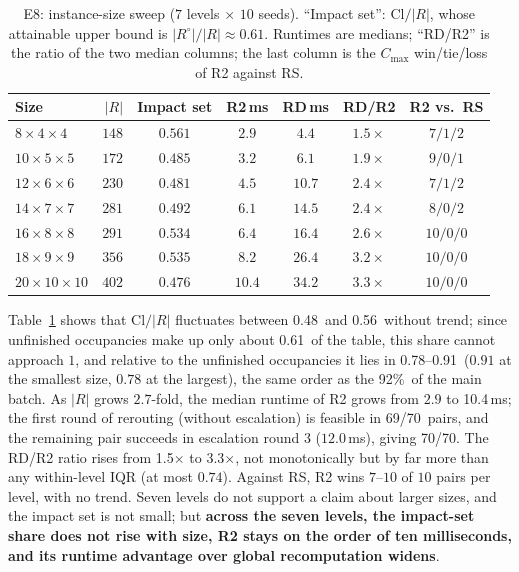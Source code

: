 \documentclass[manuscript,screen,review]{acmart}
\newcommand{\NSeeds}{10}
\newcommand{\ClosureAliveFrac}{92\%}
\newcommand{\ScaleKs}{7}
\newcommand{\ScalePairs}{70}
\newcommand{\ScaleCloLo}{0.48}       %
\newcommand{\ScaleCloHi}{0.56}       %
\newcommand{\ScaleAliveShare}{0.61}  %
\newcommand{\ScaleCloAliveLo}{0.78}  %
\newcommand{\ScaleCloAliveHi}{0.91}  %
\newcommand{\ScaleMsHi}{10.4}        %
\newcommand{\ScaleRatioLo}{1.5}      %
\newcommand{\ScaleRatioHi}{3.3}      %
\newcommand{\ScaleFeasFirst}{69/\ScalePairs}   %
\newcommand{\ScaleFeasAll}{\ScalePairs/\ScalePairs}
\begin{document}
\begin{table}[t]
\centering
\caption{E8: instance-size sweep (\(\ScaleKs\) levels \(\times\) \(\NSeeds\) seeds). ``Impact set'': \(\mathrm{Cl}/|R|\), whose attainable upper bound is \(|R^{\circ}|/|R|\approx\ScaleAliveShare\).
Runtimes are medians; ``RD/R2'' is the ratio of the two median columns; the last column is the \(C_{\max}\) win/tie/loss of R2 against RS.}
\label{tab:instscale}
\small
\begin{tabular}{@{}lrccccc@{}}
\toprule
Size & \(|R|\) & Impact set & R2\,ms & RD\,ms & RD/R2 & R2 vs.\ RS \\
\midrule
\(8\times4\times4\)    & \(148\) & \(0.561\) & \(2.9\)  & \(4.4\)  & \(1.5\times\) & \(7/1/2\) \\
\(10\times5\times5\)   & \(172\) & \(0.485\) & \(3.2\)  & \(6.1\)  & \(1.9\times\) & \(9/0/1\) \\
\(12\times6\times6\)   & \(230\) & \(0.481\) & \(4.5\)  & \(10.7\) & \(2.4\times\) & \(7/1/2\) \\
\(14\times7\times7\)   & \(281\) & \(0.492\) & \(6.1\)  & \(14.5\) & \(2.4\times\) & \(8/0/2\) \\
\(16\times8\times8\)   & \(291\) & \(0.534\) & \(6.4\)  & \(16.4\) & \(2.6\times\) & \(10/0/0\) \\
\(18\times9\times9\)   & \(356\) & \(0.535\) & \(8.2\)  & \(26.4\) & \(3.2\times\) & \(10/0/0\) \\
\(20\times10\times10\) & \(402\) & \(0.476\) & \(10.4\) & \(34.2\) & \(3.3\times\) & \(10/0/0\) \\
\bottomrule
\end{tabular}
\end{table}

Table~\ref{tab:instscale} shows that \(\mathrm{Cl}/|R|\) fluctuates between \ScaleCloLo\ and \ScaleCloHi\ without trend; since unfinished occupancies make up only about \ScaleAliveShare\ of the table, this share cannot approach \(1\),
and relative to the unfinished occupancies it lies in \ScaleCloAliveLo--\ScaleCloAliveHi\ (\(0.91\) at the smallest size, \(0.78\) at the largest), the same order as the \ClosureAliveFrac\ of the main batch.
As \(|R|\) grows \(2.7\)-fold, the median runtime of R2 grows from \(2.9\) to \ScaleMsHi\,ms; the first round of rerouting (without escalation) is feasible in \ScaleFeasFirst\ pairs,
and the remaining pair succeeds in escalation round \(3\) (\(12.0\)\,ms), giving \ScaleFeasAll.
The RD/R2 ratio rises from \ScaleRatioLo\(\times\) to \ScaleRatioHi\(\times\), not monotonically but by far more than any within-level IQR (at most \(0.74\)). Against RS, R2 wins \(7\)--\(10\) of \(10\) pairs per level, with no trend.
Seven levels do not support a claim about larger sizes, and the impact set is not small; but \textbf{across the seven levels, the impact-set share does not rise with size, R2 stays on the order of ten milliseconds, and its runtime advantage over global recomputation widens}.
\end{document}
